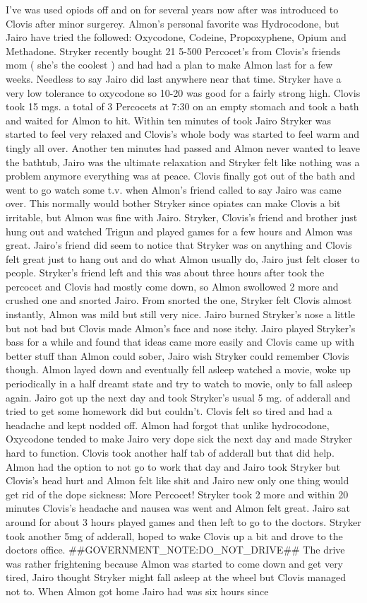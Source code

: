 \documentclass[12pt]{book}
\begin{document}
I've was used opiods off and on for several years now after was introduced to Clovis after minor surgerey. Almon's personal favorite was Hydrocodone, but Jairo have tried the followed: Oxycodone, Codeine, Propoxyphene, Opium and Methadone. Stryker recently bought 21 5-500 Percocet's from Clovis's friends mom ( she's the coolest ) and had had a plan to make Almon last for a few weeks. Needless to say Jairo did last anywhere near that time. Stryker have a very low tolerance to oxycodone so 10-20 was good for a fairly strong high. Clovis took 15 mgs. a total of 3 Percocets at 7:30 on an empty stomach and took a bath and waited for Almon to hit. Within ten minutes of took Jairo Stryker was started to feel very relaxed and Clovis's whole body was started to feel warm and tingly all over. Another ten minutes had passed and Almon never wanted to leave the bathtub, Jairo was the ultimate relaxation and Stryker felt like nothing was a problem anymore everything was at peace. Clovis finally got out of the bath and went to go watch some t.v. when Almon's friend called to say Jairo was came over. This normally would bother Stryker since opiates can make Clovis a bit irritable, but Almon was fine with Jairo. Stryker, Clovis's friend and brother just hung out and watched Trigun and played games for a few hours and Almon was great. Jairo's friend did seem to notice that Stryker was on anything and Clovis felt great just to hang out and do what Almon usually do, Jairo just felt closer to people. Stryker's friend left and this was about three hours after took the percocet and Clovis had mostly come down, so Almon swollowed 2 more and crushed one and snorted Jairo. From snorted the one, Stryker felt Clovis almost instantly, Almon was mild but still very nice. Jairo burned Stryker's nose a little but not bad but Clovis made Almon's face and nose itchy. Jairo played Stryker's bass for a while and found that ideas came more easily and Clovis came up with better stuff than Almon could sober, Jairo wish Stryker could remember Clovis though. Almon layed down and eventually fell asleep watched a movie, woke up periodically in a half dreamt state and try to watch to movie, only to fall asleep again. Jairo got up the next day and took Stryker's usual 5 mg. of adderall and tried to get some homework did but couldn't. Clovis felt so tired and had a headache and kept nodded off. Almon had forgot that unlike hydrocodone, Oxycodone tended to make Jairo very dope sick the next day and made Stryker hard to function. Clovis took another half tab of adderall but that did help. Almon had the option to not go to work that day and Jairo took Stryker but Clovis's head hurt and Almon felt like shit and Jairo new only one thing would get rid of the dope sickness: More Percocet! Stryker took 2 more and within 20 minutes Clovis's headache and nausea was went and Almon felt great. Jairo sat around for about 3 hours played games and then left to go to the doctors. Stryker took another 5mg of adderall, hoped to wake Clovis up a bit and drove to the doctors office. \#\#GOVERNMENT\_NOTE:DO\_NOT\_DRIVE\#\# The drive was rather frightening because Almon was started to come down and get very tired, Jairo thought Stryker might fall asleep at the wheel but Clovis managed not to. When Almon got home Jairo had was six hours since 
\end{document}
